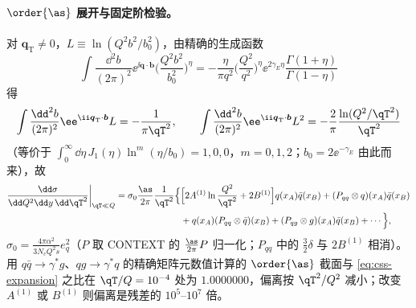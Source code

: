 \paragraph{$\order{\as}$ 展开与固定阶检验。}对 $\boldsymbol q_{\mathrm T}\ne0$，$L\equiv\ln(Q^2b^2/b_0^2)$，由精确的生成函数
\[
  \int\frac{\dd^2b}{(2\pi)^2}\ee^{\ii\boldsymbol q\cdot\boldsymbol b}\Big(\frac{Q^2b^2}{b_0^2}\Big)^{\eta}
  =-\frac{\eta}{\pi q^2}\Big(\frac{Q^2}{q^2}\Big)^{\eta}\ee^{2\gamma_E\eta}\frac{\Gamma(1+\eta)}{\Gamma(1-\eta)}
\]
得
\begin{equation}
  \int\frac{\dd^2b}{(2\pi)^2}\ee^{\ii\boldsymbol q_{\mathrm T}\cdot\boldsymbol b}L=-\frac{1}{\pi\qT^2},\qquad
  \int\frac{\dd^2b}{(2\pi)^2}\ee^{\ii\boldsymbol q_{\mathrm T}\cdot\boldsymbol b}L^2=-\frac{2}{\pi}\frac{\ln(Q^2/\qT^2)}{\qT^2}
  \label{eq:ft-logs}
\end{equation}
（等价于 $\int_0^\infty\dd\eta\,J_1(\eta)\ln^m(\eta/b_0)=1,0,0$，$m=0,1,2$；$b_0=2\ee^{-\gamma_E}$ 由此而来），故
\begin{equation}
  \begin{split}
  \frac{\dd\sigma}{\dd Q^2\dd y\,\dd\qT^2}\bigg|_{\qT\ll Q}=\sigma_0\frac{\as}{2\pi}\frac1{\qT^2}\Big\{&\Big[2A^{(1)}\ln\frac{Q^2}{\qT^2}+2B^{(1)}\Big]q(x_A)\bar q(x_B)
  +(P_{qq}\otimes q)(x_A)\bar q(x_B)\\
  &+q(x_A)(P_{qq}\otimes\bar q)(x_B)+(P_{qg}\otimes g)(x_A)\bar q(x_B)+\cdots\Big\},
  \end{split}
  \label{eq:css-expansion}
\end{equation}
$\sigma_0=\frac{4\pi\alpha^2}{3N_cQ^2s}e_q^2$（$P$ 取 CONTEXT 的 $\frac{\as}{2\pi}P$ 归一化；$P_{qq}$ 中的 $\frac32\delta$ 与 $2B^{(1)}$ 相消）。
用 $q\bar q\to\gamma^*g$、$qg\to\gamma^*q$ 的精确矩阵元数值计算的 $\order{\as}$ 截面与 \eqref{eq:css-expansion} 之比在 $\qT/Q=10^{-4}$
处为 $1.0000000$，偏离按 $\qT^2/Q^2$ 减小；改变 $A^{(1)}$ 或 $B^{(1)}$ 则偏离是残差的 $10^5$--$10^7$ 倍。
